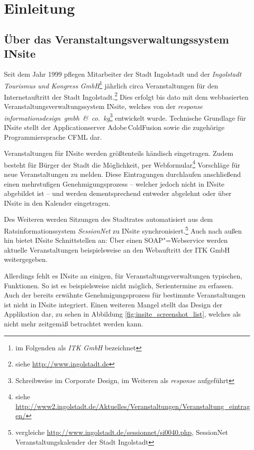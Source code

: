 
\chapter{Einleitung}
\label{ch:intro}

\section{Über das Veranstaltungsverwaltungssystem INsite}
\label{sec:about_insite}

Seit dem Jahr 1999 pflegen Mitarbeiter der Stadt Ingolstadt und der \emph{Ingolstadt Tourismus und Kongress GmbH}\footnote{im Folgenden als \emph{ITK GmbH} bezeichnet} jährlich circa  Veranstaltungen für den Internetauftritt der Stadt Ingolstadt.\footnote{siehe \url{http://www.ingolstadt.de}} Dies erfolgt bis dato mit dem webbasierten Veranstaltungsverwaltungssystem INsite, welches von der \emph{response informationsdesign~gmbh~\&~co.~kg}\footnote{Schreibweise im Corporate Design, im Weiteren als \emph{response} aufgeführt} entwickelt wurde. Technische Grundlage für INsite stellt der Applicationserver Adobe\,ColdFusion sowie die zugehörige Programmiersprache CFML dar.

Veranstaltungen für INsite werden größtenteils händisch eingetragen. Zudem besteht für Bürger der Stadt die Möglichkeit, per Webformular\footnote{siehe\,\url{http://www2.ingolstadt.de/Aktuelles/Veranstaltungen/Veranstaltung_eintragen/}} Vorschläge für neue Veranstaltungen zu melden. Diese Eintragungen durchlaufen anschließend einen mehrstufigen Genehmigungsprozess -- welcher jedoch nicht in INsite abgebildet ist -- und werden dementsprechend entweder abgelehnt oder über INsite in den Kalender eingetragen.

Des Weiteren werden Sitzungen des Stadtrates automatisiert aus dem Ratsinformationssystem \emph{SessionNet} zu INsite synchronisiert.\footnote{vergleiche \url{http://www.ingolstadt.de/sessionnet/si0040.php}, SessionNet Veranstaltungskalender der Stadt Ingolstadt} Auch nach außen hin bietet INsite Schnittstellen an: Über einen SOAP"=Webservice werden aktuelle Veranstaltungen beispielsweise an den Webauftritt der ITK GmbH weitergegeben.

Allerdings fehlt es INsite an einigen, für Veranstaltungsverwaltungen typischen, Funktionen. So ist es beispielsweise nicht möglich, Serientermine zu erfassen. Auch der bereits erwähnte Genehmigungsprozess für bestimmte Veranstaltungen ist nicht in INsite integriert. Einen weiteren Mangel stellt das Design der Applikation dar, zu sehen in Abbildung \ref{fig:insite_screenshot_list}, welches als nicht mehr zeitgemäß betrachtet werden kann.

